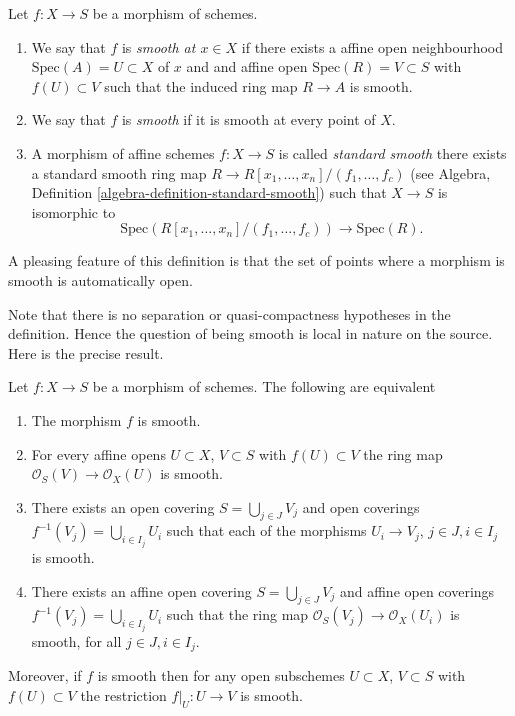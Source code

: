 \begin{definition}
\label{definition-smooth}
Let $f : X \to S$ be a morphism of schemes.
\begin{enumerate}
\item We say that $f$ is {\it smooth at $x \in X$} if
there exists a affine open neighbourhood $\text{Spec}(A) = U \subset X$
of $x$ and and affine open $\text{Spec}(R) = V \subset S$
with $f(U) \subset V$ such that the induced ring map
$R \to A$ is smooth.
\item We say that $f$ is {\it smooth} if it is smooth at every point of $X$.
\item A morphism of affine schemes $f : X \to S$
is called {\it standard smooth} there exists a standard smooth ring
map $R \to R[x_1, \ldots, x_n]/(f_1, \ldots, f_c)$ (see
Algebra, Definition \ref{algebra-definition-standard-smooth})
such that $X \to S$ is isomorphic to
$$
\text{Spec}(R[x_1, \ldots, x_n]/(f_1, \ldots, f_c)) \to \text{Spec}(R).
$$
\end{enumerate}
\end{definition}

\noindent
A pleasing feature of this definition is that the set of points
where a morphism is smooth is automatically open.

\medskip\noindent
Note that there is no separation or quasi-compactness hypotheses in the
definition. Hence the question of being smooth is local in nature on
the source. Here is the precise result.

\begin{lemma}
\label{lemma-smooth-characterize}
Let $f : X \to S$ be a morphism of schemes.
The following are equivalent
\begin{enumerate}
\item The morphism $f$ is smooth.
\item For every affine opens $U \subset X$, $V \subset S$
with $f(U) \subset V$ the ring map
$\mathcal{O}_S(V) \to \mathcal{O}_X(U)$ is smooth.
\item There exists an open covering $S = \bigcup_{j \in J} V_j$
and open coverings $f^{-1}(V_j) = \bigcup_{i \in I_j} U_i$ such
that each of the morphisms $U_i \to V_j$, $j\in J, i\in I_j$
is smooth.
\item There exists an affine open covering $S = \bigcup_{j \in J} V_j$
and affine open coverings $f^{-1}(V_j) = \bigcup_{i \in I_j} U_i$ such
that the ring map $\mathcal{O}_S(V_j) \to \mathcal{O}_X(U_i)$ is
smooth, for all $j\in J, i\in I_j$.
\end{enumerate}
Moreover, if $f$ is smooth then for
any open subschemes $U \subset X$, $V \subset S$ with $f(U) \subset V$
the restriction $f|_U : U \to V$ is smooth.
\end{lemma}

